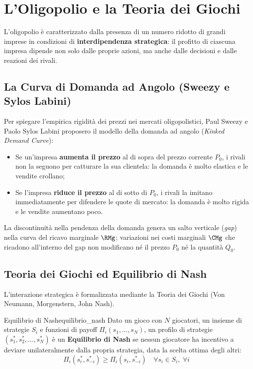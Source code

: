 \section{L'Oligopolio e la Teoria dei Giochi}

L'oligopolio è caratterizzato dalla presenza di un numero ridotto di grandi imprese in condizioni di \textbf{interdipendenza strategica}: il profitto di ciascuna impresa dipende non solo dalle proprie azioni, ma anche dalle decisioni e dalle reazioni dei rivali.

\subsection{La Curva di Domanda ad Angolo (Sweezy e Sylos Labini)}
Per spiegare l'empirica rigidità dei prezzi nei mercati oligopolistici, Paul Sweezy e Paolo Sylos Labini proposero il modello della domanda ad angolo (\textit{Kinked Demand Curve}):
\begin{itemize}
    \item Se un'impresa \textbf{aumenta il prezzo} al di sopra del prezzo corrente $P_0$, i rivali non la seguono per catturare la sua clientela: la domanda è molto elastica e le vendite crollano;
    \item Se l'impresa \textbf{riduce il prezzo} al di sotto di $P_0$, i rivali la imitano immediatamente per difendere le quote di mercato: la domanda è molto rigida e le vendite aumentano poco.
\end{itemize}
La discontinuità nella pendenza della domanda genera un salto verticale (\textit{gap}) nella curva del ricavo marginale $\RMg$; variazioni nei costi marginali $\CMg$ che ricadono all'interno del gap non modificano né il prezzo $P_0$ né la quantità $Q_0$.

\subsection{Teoria dei Giochi ed Equilibrio di Nash}
L'interazione strategica è formalizzata mediante la Teoria dei Giochi (Von Neumann, Morgenstern, John Nash).

\begin{definizione}{Equilibrio di Nash}{equilibrio_nash}
Dato un gioco con $N$ giocatori, un insieme di strategie $S_i$ e funzioni di payoff $\Pi_i(s_1, \dots, s_N)$, un profilo di strategie $(s_1^*, s_2^*, \dots, s_N^*)$ è un \textbf{Equilibrio di Nash} se nessun giocatore ha incentivo a deviare unilateralmente dalla propria strategia, data la scelta ottima degli altri:
\begin{equation}
    \Pi_i(s_i^*, s_{-i}^*) \ge \Pi_i(s_i, s_{-i}^*) \quad \forall s_i \in S_i, \; \forall i
\end{equation}
\end{definizione}

